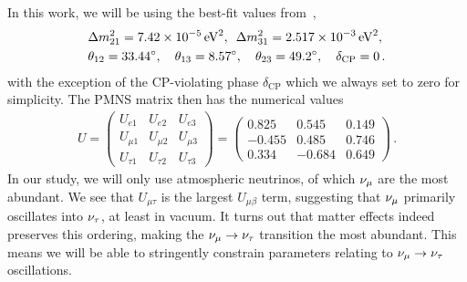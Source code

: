 In this work, we will be using the best-fit values from~\cite{nufit},
\begin{align}\label{eq:nufitparams}
    &\Delta m^2_{21} =  \SI{7.42e-5}{\electronvolt^2},\hspace{0.5em} \Delta m^2_{31} =  \SI{2.517e-3}{\electronvolt^2}, \nonumber \\
    &\theta_{12} = \SI{33.44}{\degree},\hspace{1em} \theta_{13} = \SI{8.57}{\degree},\hspace{1em} \theta_{23} = \SI{49.2}{\degree}, \hspace{1em} \delta_\text{CP} = 0\,.
\end{align}
with the exception of the CP-violating phase $\delta_\text{CP}$ which we always set to zero for simplicity. The PMNS matrix then has the numerical values 
\begin{align}\label{eq:Uvalues}
    U = \begin{pmatrix}
        U_{e 1} & U_{e2} & U_{e3} \\
        U_{\mu 1} & U_{\mu 2} & U_{\mu 3} \\
        U_{\tau 1} & U_{\tau 2} & U_{\tau 3}
    \end{pmatrix} 
    = \begin{pmatrix}
        0.825 & 0.545 & 0.149 \\
        -0.455 & 0.485 & 0.746 \\
        0.334 & -0.684 & 0.649
    \end{pmatrix} \,.
\end{align}
In our study, we will only use atmospheric neutrinos, of which $\nu_\mu$ are the most abundant. We see that $U_{\mu\tau}$ is the largest $U_{\mu\beta}$ term,
suggesting that $\nu_\mu$ primarily oscillates into $\nu_\tau$, at least in vacuum. It turns out that matter effects indeed preserves this ordering, making the $\nu_\mu \to \nu_\tau$ transition
the most abundant. This means we will be able to stringently constrain parameters relating to $\nu_\mu \to \nu_\tau$ oscillations. 


%